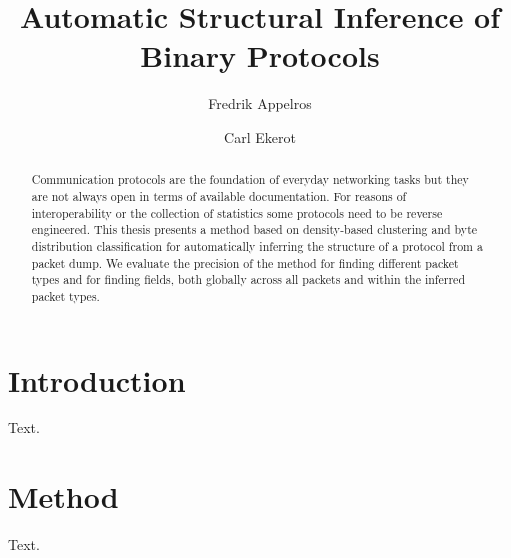 \documentclass[a4paper,twocolumn]{article}
\begin{document}
\title{Automatic Structural Inference of Binary Protocols}
\author{Fredrik Appelros \and Carl Ekerot}
\maketitle

\begin{abstract}
Communication protocols are the foundation of everyday networking tasks but
they are not always open in terms of available documentation. For reasons of
interoperability or the collection of statistics some protocols need to be
reverse engineered. This thesis presents a method based on density-based
clustering and byte distribution classification for automatically inferring the
structure of a protocol from a packet dump. We evaluate the precision of the
method for finding different packet types and for finding fields, both globally
across all packets and within the inferred packet types.
\end{abstract}

\section{Introduction}
Text.

\section{Method}
Text.
\end{document}
